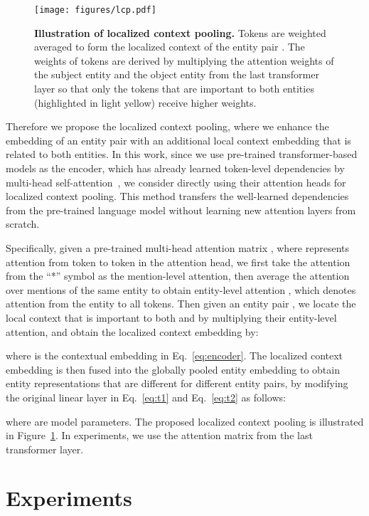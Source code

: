 \documentclass[letterpaper]{article}
\begin{document}
\begin{figure}[!t]
    \centering
    \texttt{[image: figures/lcp.pdf]}
    \caption{\textbf{Illustration of localized context pooling.} Tokens are weighted averaged to form the localized context  of the entity pair .
    The weights of tokens are derived by multiplying the attention weights of the subject entity  and the object entity  from the last transformer layer so that only the tokens that are important to both entities (highlighted in light yellow) receive higher weights.
    }
    \label{fig:lcp}
\end{figure}

Therefore we propose the localized context pooling, where we enhance the embedding of an entity pair with an additional local context embedding that is related to both entities.
In this work, since we use pre-trained transformer-based models as the encoder, which has already learned token-level dependencies by multi-head self-attention~\cite{Vaswani2017AttentionIA}, we consider directly using their attention heads for localized context pooling.
This method transfers the well-learned dependencies from the pre-trained language model without learning new attention layers from scratch.

Specifically, given a pre-trained multi-head attention matrix , where  represents attention from token  to token  in the  attention head, we first take the attention from the ``*'' symbol as the mention-level attention, then average the attention over mentions of the same entity to obtain entity-level attention , which denotes attention from the  entity to all tokens.
Then given an entity pair , we locate the local context that is important to both  and  by multiplying their entity-level attention, and obtain the localized context embedding  by:

where  is the contextual embedding in Eq.~\eqref{eq:encoder}.
The localized context embedding is then fused into the globally pooled entity embedding to obtain entity representations that are different for different entity pairs, by modifying the original linear layer in Eq.~\eqref{eq:t1} and Eq.~\eqref{eq:t2} as follows:

where  are model parameters.
The proposed localized context pooling is illustrated in Figure~\ref{fig:lcp}.
In experiments, we use the attention matrix from the last transformer layer.

\section{Experiments}
\end{document}
